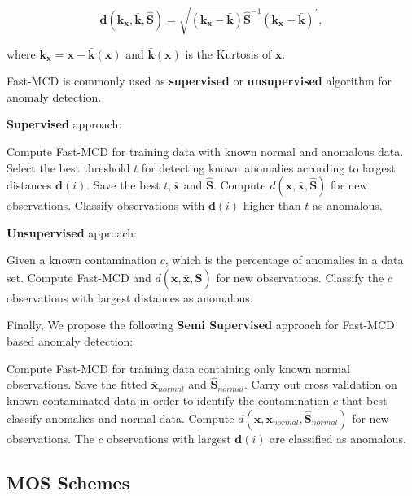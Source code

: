 \documentclass[review]{elsarticle}
\begin{document}
\begin{equation}\label{eq:eq09}
	\boldsymbol{d}(\boldsymbol{k}_{\boldsymbol{x}}, \bar{\boldsymbol{k}}, \boldsymbol{\hat{S}}) = \sqrt{(\boldsymbol{k}_{\boldsymbol{x}} - \bar{\boldsymbol{k}}) \boldsymbol{\hat{S}}^{-1}(\boldsymbol{k}_{\boldsymbol{x}} - \bar{\boldsymbol{k}})^\prime}, 
\end{equation}

where $\boldsymbol{k}_{\boldsymbol{x}} = \boldsymbol{x} - \boldsymbol{\bar{k}}(\boldsymbol{x})$ and $\boldsymbol{\bar{k}}(\boldsymbol{x})$ is the Kurtosis of $\boldsymbol{x}$.

Fast-MCD is commonly used as \textbf{supervised} or \textbf{unsupervised} algorithm for anomaly detection.
		
\textbf{Supervised} approach:

Compute Fast-MCD for training data with known normal and anomalous data.
Select the best threshold $t$ for detecting known anomalies according to largest distances $\boldsymbol{d}(i)$.
Save the best $t, \boldsymbol{\bar{x}}$ and $\boldsymbol{\hat{S}}$.
Compute $d(\boldsymbol{x},\bar{\boldsymbol{x}}, \boldsymbol{\hat{S}})$ for new observations.
Classify observations with $\boldsymbol{d}(i)$ higher than $t$ as anomalous.

\textbf{Unsupervised} approach:

Given a known contamination $c$, which is the percentage of anomalies in a data set.
Compute Fast-MCD and $d(\boldsymbol{x},\bar{\boldsymbol{x}}, \boldsymbol{\hat{S}})$ for new observations.
Classify the $c$ observations with largest distances as anomalous.

Finally, We propose the following \textbf{Semi Supervised} approach for Fast-MCD based anomaly detection:

Compute Fast-MCD for training data containing only known normal observations.
Save the fitted $\boldsymbol{\bar{x}}_{normal}$ and $\boldsymbol{\hat{S}}_{normal}$.
Carry out cross validation on known contaminated data in order to identify the contamination $c$ that best classify anomalies and normal data.
Compute $d(\boldsymbol{x},\bar{\boldsymbol{x}}_{normal}, \boldsymbol{\hat{S}}_{normal})$ for new observations.
The $c$ observations with largest $\boldsymbol{d}(i)$ are classified as anomalous.


\subsection{MOS Schemes}
\label{sec:prop_MOSSchemes}
\end{document}
